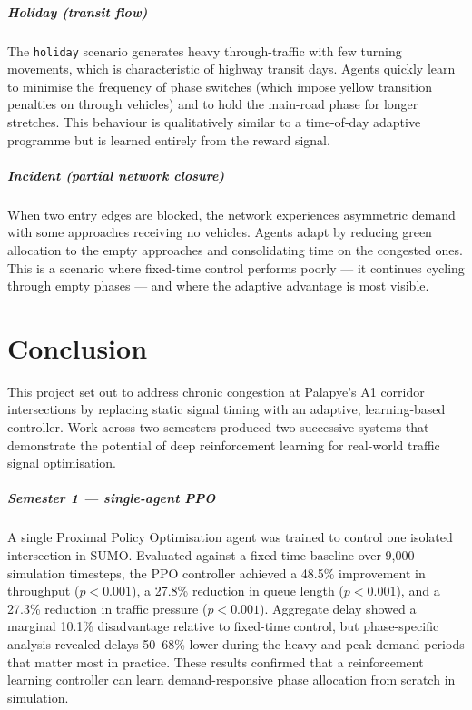 \documentclass[11pt, a4paper]{report}
\begin{document}
\paragraph{Holiday (transit flow)}

The \texttt{holiday} scenario generates heavy through-traffic with few turning movements, which is characteristic of highway transit days. Agents quickly learn to minimise the frequency of phase switches (which impose yellow transition penalties on through vehicles) and to hold the main-road phase for longer stretches. This behaviour is qualitatively similar to a time-of-day adaptive programme but is learned entirely from the reward signal.

\paragraph{Incident (partial network closure)}

When two entry edges are blocked, the network experiences asymmetric demand with some approaches receiving no vehicles. Agents adapt by reducing green allocation to the empty approaches and consolidating time on the congested ones. This is a scenario where fixed-time control performs poorly --- it continues cycling through empty phases --- and where the adaptive advantage is most visible.

\chapter{Conclusion}

This project set out to address chronic congestion at Palapye's A1 corridor intersections by replacing static signal timing with an adaptive, learning-based controller. Work across two semesters produced two successive systems that demonstrate the potential of deep reinforcement learning for real-world traffic signal optimisation.

\paragraph{Semester 1 --- single-agent PPO}

A single Proximal Policy Optimisation agent was trained to control one isolated intersection in SUMO. Evaluated against a fixed-time baseline over 9,000 simulation timesteps, the PPO controller achieved a 48.5\% improvement in throughput ($p < 0.001$), a 27.8\% reduction in queue length ($p < 0.001$), and a 27.3\% reduction in traffic pressure ($p < 0.001$). Aggregate delay showed a marginal 10.1\% disadvantage relative to fixed-time control, but phase-specific analysis revealed delays 50--68\% lower during the heavy and peak demand periods that matter most in practice. These results confirmed that a reinforcement learning controller can learn demand-responsive phase allocation from scratch in simulation.
\end{document}
